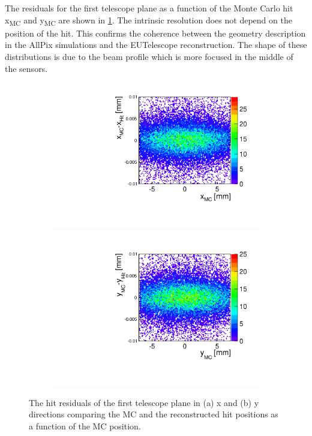 The residuals for the first telescope plane as a function of the Monte
Carlo hit x\textsubscript{MC} and y\textsubscript{MC} are shown in
\cref{fig:TelPlane0_MC_hit_2D}. The intrinsic resolution does not
depend on the position of the hit. This confirms the coherence between
the geometry description in the AllPix simulations and the EUTelescope
reconstruction. The shape of these distributions is due to the beam
profile which is more focused in the middle of the sensors.

\begin{figure}[htbp] \centering
  \begin{subfigure}[b]{0.45\textwidth}
    \includegraphics[width=\textwidth]{figures/Telescope/telescopePlane0_MC_vs_hit_x_2D.pdf}
    \caption{}
  \end{subfigure}\hfill
  \begin{subfigure}[b]{0.45\textwidth}
    \includegraphics[width=\textwidth]{figures/Telescope/telescopePlane0_MC_vs_hit_y_2D.pdf}
    \caption{}
  \end{subfigure}
  \caption{The hit residuals of the first telescope plane in (a) x and
    (b) y directions comparing the MC and the reconstructed hit
    positions as a function of the MC position.}
  \label{fig:TelPlane0_MC_hit_2D}
\end{figure}


